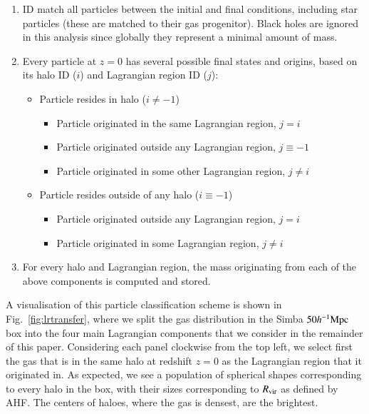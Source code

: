 \documentclass[fleqn,usenatbib]{mnras}
\newcommand{\hmpc}{h^{-1}{\rm Mpc}}
\newcommand{\simba}{{\sc Simba}}
\begin{document}
\begin{enumerate}
	\item ID match all particles between the initial and final conditions, including
	      star particles (these are matched to their gas progenitor). Black holes are ignored in this analysis since globally they represent a minimal amount of mass.

	\item Every particle at $z=0$ has several possible final states and origins, based on its halo ID ($i$) and Lagrangian region ID ($j$):
	      \begin{itemize}
	            \item Particle resides in  halo ($i \neq -1$)
	            \begin{itemize}
	           		\item Particle originated in the same Lagrangian region, $j = i$
	           		\item Particle originated outside any Lagrangian region, $j \equiv -1$
	           		\item Particle originated in some other Lagrangian region, $j \neq i$
	            \end{itemize}
	            \item Particle resides outside of any halo ($i \equiv -1$)
	            \begin{itemize}
	            	\item Particle originated outside any Lagrangian region, $j = i$
	            	\item Particle originated in some Lagrangian region, $j \neq i$
	            \end{itemize}
	      \end{itemize}
	      
	\item For every halo and Lagrangian region, the mass originating from each
	      of the above components is computed and stored.
\end{enumerate}



A visualisation of this particle classification scheme is shown in
Fig.~\ref{fig:lrtransfer}, where we split the gas distribution in the
\simba{} $50\hmpc{}$ box into the four main Lagrangian components that we
consider in the remainder of this paper. Considering each panel clockwise
from the top left, we select first the gas that is in the same halo at
redshift $z=0$ as the Lagrangian region that it originated in. As expected,
we see a population of spherical shapes corresponding to every halo in the
box, with their sizes corresponding to $R_{\rm vir}$ as defined by AHF. The
centers of haloes, where the gas is densest, are the brightest.
\end{document}

